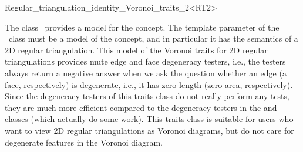 

\begin{ccRefClass}{Regular_triangulation_identity_Voronoi_traits_2<RT2>}


\ccDefinition

The class \ccRefName\ provides a model for the 
concept. The template parameter of the \ccRefName\ class must be a
model of the  concept, and in particular it has
the semantics of a 2D regular triangulation.
%
This model of the Voronoi traits for 2D regular triangulations provides
mute edge and face degeneracy testers, i.e., the testers always
return a negative answer when we ask the question whether an edge (a
face, respectively) is degenerate, i.e., it has zero length (zero
area, respectively).
Since the degeneracy testers of this traits class do not really
perform any tests, they are much more efficient compared to the
degeneracy testers in the
 and
 classes
(which actually do some work). This traits class is suitable for
users who want to view 2D regular triangulations as Voronoi diagrams,
but do not care for degenerate features in the Voronoi diagram.




\ccIsModel
{}

\ccTypes
{}
\ccGlue
{}

\ccSeeAlso
{}\\
\\
\\
\\
\end{ccRefClass}


